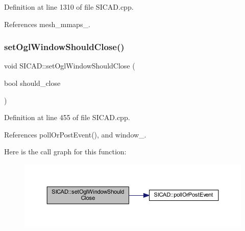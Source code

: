 Definition at line 1310 of file S\+I\+C\+A\+D.\+cpp.



References mesh\+\_\+mmaps\+\_\+.

\mbox{\label{classSICAD_a0e42acab32252ddc878794f365ee1037}} 
\subsubsection{\texorpdfstring{set\+Ogl\+Window\+Should\+Close()}{setOglWindowShouldClose()}}
{\footnotesize\ttfamily void S\+I\+C\+A\+D\+::set\+Ogl\+Window\+Should\+Close (\begin{DoxyParamCaption}\item[{bool}]{should\+\_\+close }\end{DoxyParamCaption})}



Definition at line 455 of file S\+I\+C\+A\+D.\+cpp.



References poll\+Or\+Post\+Event(), and window\+\_\+.

Here is the call graph for this function\+:\nopagebreak
\begin{figure}[H]
\begin{center}
\leavevmode
\includegraphics[width=350pt]{classSICAD_a0e42acab32252ddc878794f365ee1037_cgraph}
\end{center}
\end{figure}
\mbox{\label{classSICAD_a39cdff6871d32429d8ba95b776e0b874}} 
